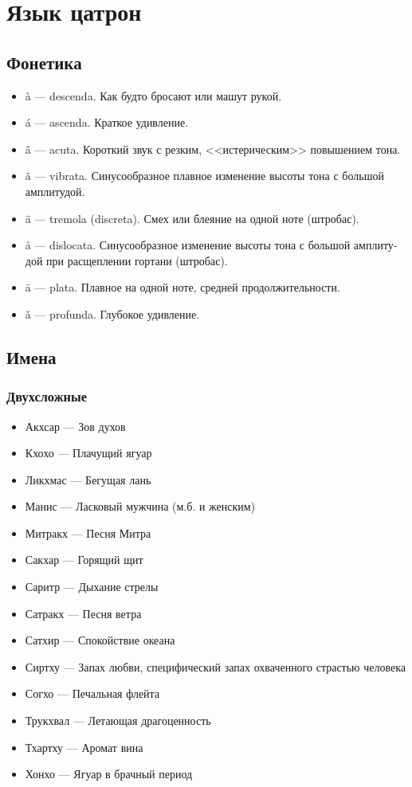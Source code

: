 \documentclass[a4paper,12pt,fleqn]{book}\usepackage{cooltooltips}\usepackage{polyglossia}\setdefaultlanguage[babelshorthands=true]{russian}\setotherlanguage{english}\defaultfontfeatures{Ligatures=TeX,Mapping=tex-text} \usepackage{xcolor}\definecolor{lightgray}{HTML}{bbbbbb}\color{lightgray}\newcommand{\ml}[3]{\textenglish{\textcolor{black}{#3}}}
\begin{document}
{\section{Язык цатрон}

\subsection{Фонетика}

\begin{itemize}
\item \`a --- descenda. Как будто бросают или машут рукой.
\item \'a --- ascenda. Краткое удивление.
\item \^a --- acuta. Короткий звук с резким, <<истерическим>> повышением тона.
\item \~a --- vibrata. Синусообразное плавное изменение высоты тона с большой амплитудой.
\item \"a --- tremola (discreta). Смех или блеяние на одной ноте (штробас).
\item \r{a} --- dislocata. Синусообразное изменение высоты тона с большой амплитудой при расщеплении гортани (штробас).
\item \=a --- plata. Плавное на одной ноте, средней продолжительности.
\item \v{a} --- profunda. Глубокое удивление.
\end{itemize}

\subsection{Имена}

\subsubsection{Двухсложные}

\begin{itemize}
\item Акхсар --- Зов духов
\item Кхохо --- Плачущий ягуар
\item Ликхмас --- Бегущая лань
\item Манис --- Ласковый мужчина (м.б. и женским)
\item Митракх --- Песня Митра
\item Сакхар --- Горящий щит
\item Саритр --- Дыхание стрелы
\item Сатракх --- Песня ветра
\item Сатхир --- Спокойствие океана
\item Сиртху --- Запах любви, специфический запах охваченного страстью человека
\item Согхо --- Печальная флейта
\item Трукхвал --- Летающая драгоценность
\item Тхартху --- Аромат вина
\item Хонхо --- Ягуар в брачный период
\end{itemize}

}
\end{document}
